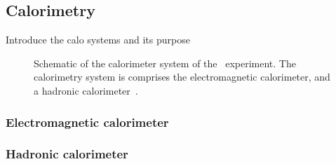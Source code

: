\FloatBarrier
\subsection{Calorimetry} 

{\color{red} Introduce the calo systems and its purpose}

\begin{figure}[ht]
  \caption[
    Schematic of the calorimeter system of the
    \atlas\ experiment~\cite{cern-jinst-atlas}.
  ]{
    Schematic of the calorimeter system of the
    \atlas\ experiment.
    The calorimetry system is comprises the electromagnetic calorimeter,
    and a hadronic calorimeter~\cite{cern-jinst-atlas}.
  }
  \label{fig:calo_cartoon}
\end{figure}


\FloatBarrier
\subsubsection{Electromagnetic calorimeter} 

\FloatBarrier
\subsubsection{Hadronic calorimeter} 

\FloatBarrier
